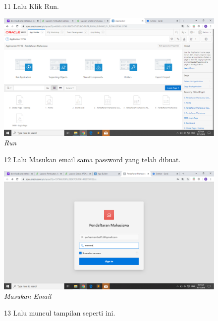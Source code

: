 \begin{enumerate}
\begin{figure}
\item[11] Lalu Klik Run.
    \begin{center}
\includegraphics[scale=0.2]{figures/11.png}
    \caption{\textit{Run}}
        \end{center}
\label{gambar}
\end{figure}

\begin{figure}
\item[12] Lalu Masukan email sama password yang telah dibuat.

    \begin{center}
\includegraphics[scale=0.2]{figures/12.png}
    \caption{\textit{Masukan Email}}
        \end{center}
\label{gambar}
\end{figure}

\begin{figure}
\item[13] Lalu muncul tampilan seperti ini.


\end{figure}
\end{enumerate}
